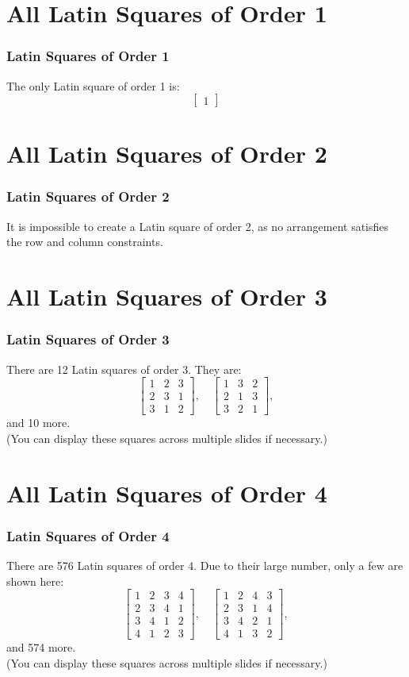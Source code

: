 \documentclass{beamer}
\begin{document}
\section{All Latin Squares of Order 1}
\begin{frame}
\frametitle{Latin Squares of Order 1}
The only Latin square of order 1 is:
\[
\begin{bmatrix}
1
\end{bmatrix}
\]
\end{frame}

\section{All Latin Squares of Order 2}
\begin{frame}
\frametitle{Latin Squares of Order 2}
It is impossible to create a Latin square of order 2, as no arrangement satisfies the row and column constraints.
\end{frame}

\section{All Latin Squares of Order 3}
\begin{frame}
\frametitle{Latin Squares of Order 3}
There are 12 Latin squares of order 3. They are:
\[
\begin{bmatrix}
1 & 2 & 3 \\
2 & 3 & 1 \\
3 & 1 & 2
\end{bmatrix},
\quad
\begin{bmatrix}
1 & 3 & 2 \\
2 & 1 & 3 \\
3 & 2 & 1
\end{bmatrix},
\]
and 10 more.\\
(You can display these squares across multiple slides if necessary.)
\end{frame}

\section{All Latin Squares of Order 4}
\begin{frame}
\frametitle{Latin Squares of Order 4}
There are 576 Latin squares of order 4. Due to their large number, only a few are shown here:
\[
\begin{bmatrix}
1 & 2 & 3 & 4 \\
2 & 3 & 4 & 1 \\
3 & 4 & 1 & 2 \\
4 & 1 & 2 & 3
\end{bmatrix},
\quad
\begin{bmatrix}
1 & 2 & 4 & 3 \\
2 & 3 & 1 & 4 \\
3 & 4 & 2 & 1 \\
4 & 1 & 3 & 2
\end{bmatrix},
\]
and 574 more.\\
(You can display these squares across multiple slides if necessary.)
\end{frame}
\end{document}

